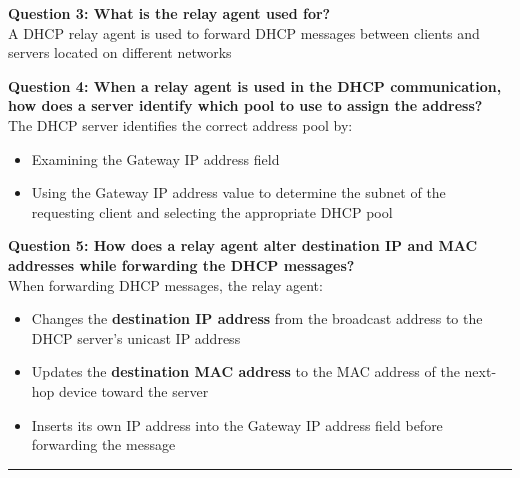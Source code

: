 \documentclass[a4paper,12pt]{article}
\begin{document}
	\textbf{Question 3: What is the relay agent used for?}\\
	A DHCP relay agent is used to forward DHCP messages between clients and servers located on different networks
	
	\textbf{Question 4: When a relay agent is used in the DHCP communication, how does a server identify which pool to use to assign the address?}\\
	The DHCP server identifies the correct address pool by:
	\begin{itemize}
		\item Examining the Gateway IP address field
		\item Using the Gateway IP address value to determine the subnet of the requesting client and selecting the appropriate DHCP pool
	\end{itemize}
	
	\textbf{Question 5: How does a relay agent alter destination IP and MAC addresses while forwarding the DHCP messages?}\\
	When forwarding DHCP messages, the relay agent:
	\begin{itemize}
		\item Changes the \textbf{destination IP address} from the broadcast address to the DHCP server’s unicast IP address
		\item Updates the \textbf{destination MAC address} to the MAC address of the next-hop device toward the server
		\item Inserts its own IP address into the Gateway IP address field before forwarding the message
	\end{itemize}
	
	\vspace{1em}
	\hrule
	\vspace{0.5em}
	
\end{document}
